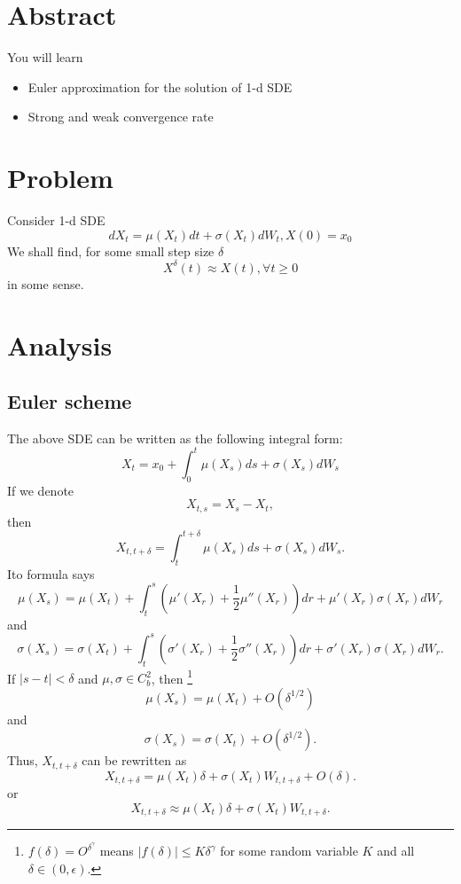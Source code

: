 \documentclass{article}
\begin{document}
\section{Abstract}
You will learn
\begin{itemize}
 \item Euler approximation for the solution of 1-d SDE
 \item Strong and weak convergence rate
\end{itemize}

\section{Problem}

Consider 1-d SDE 
$$d X_{t} = \mu(X_{t}) dt + \sigma(X_{t}) dW_{t}, X(0) = x_{0}$$
We shall find, for some small step size $\delta$
$$X^{\delta} (t) \approx X(t), \forall t\ge 0$$
in some sense.

\section{Analysis}
\subsection{Euler scheme}
The above SDE can be written as the following integral form:
$$
X_{t} = x_{0}  + \int_{0}^{t}  \mu(X_{s}) ds + \sigma(X_{s}) dW_{s}
$$
If we denote 
$$X_{t,s} = X_{s} - X_{t},$$
then 
$$X_{t,t+\delta} = \int_{t}^{t+\delta}  \mu(X_{s}) ds + \sigma(X_{s}) dW_{s}.$$
Ito formula says
$$
\mu(X_{s}) =
\mu(X_{t}) + \int_{t}^{s} (\mu'(X_{r}) + \frac 1 2 \mu''(X_{r})) dr + \mu'(X_{r}) \sigma(X_{r}) dW_{r}
$$
and
$$
\sigma(X_{s}) =
\sigma(X_{t}) + 
\int_{t}^{s} (\sigma'(X_{r}) + \frac 1 2 \sigma''(X_{r})) dr + \sigma'(X_{r}) \sigma(X_{r}) dW_{r}.
$$
If $|s - t| < \delta$ and $\mu, \sigma \in C_{b}^{2}$, then
\footnote{
$f(\delta) = O^{\delta^{\gamma}}$ means 
$|f(\delta)| \le K \delta^{\gamma}$
for some random variable $K$ and all $\delta \in (0, \epsilon)$.
}
$$\mu(X_{s}) = \mu(X_{t}) + O(\delta^{1/2})$$
and 
$$\sigma(X_{s}) = \sigma(X_{t}) + O(\delta^{1/2}).$$
Thus, $X_{t, t+\delta}$ can be rewritten as
$$X_{t, t+\delta} = \mu(X_{t}) \delta + \sigma(X_{t}) W_{t,t+\delta} + O(\delta).
$$
or 
$$
X_{t, t+\delta} \approx \mu(X_{t}) \delta + \sigma(X_{t}) W_{t,t+\delta}.
$$
\end{document}

